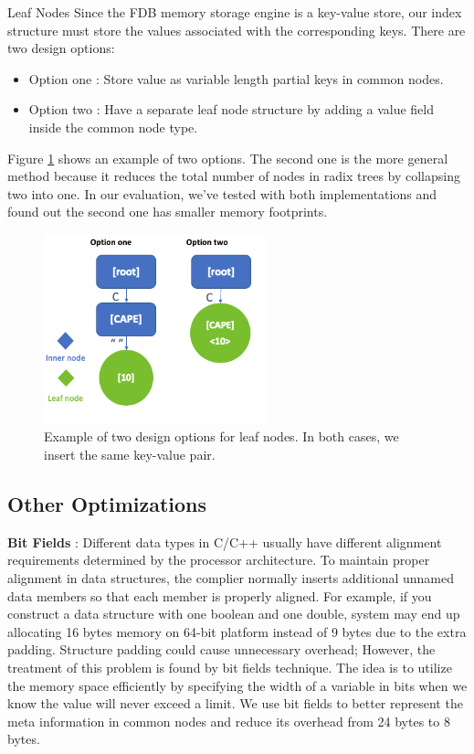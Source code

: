 \documentclass[sigplan,screen,nonacm]{acmart}
\makeatletter
\def\subsubsection{\@startsection{subsubsection}{3}%
  \z@{.5\linespacing\@plus.7\linespacing}{.1\linespacing}%
  {\normalfont\itshape}}
\makeatother
\begin{document}
\subsubsection{Leaf Nodes}
Since the FDB memory storage engine is a key-value store, our index structure must store the values associated with the corresponding keys. There are two design options: 
\begin{itemize}
    \item Option one : Store value as variable length partial keys in common nodes. 
    \item Option two : Have a separate leaf node structure by adding a value field inside the common node type. 
\end{itemize}
Figure \ref{fig:leaf-nodes} shows an example of two options. The second one is the more general method because it reduces the total number of nodes in radix trees by collapsing two into one. In our evaluation, we’ve tested with both implementations and found out the second one has smaller memory footprints. 
\begin{figure}[h]
  \centering
  \includegraphics[width=\linewidth, height=5.5cm]{pic/leaf nodes.png}
  \setlength{\belowcaptionskip}{-10pt} 
  \caption{Example of two design options for leaf nodes. In both cases, we insert the same key-value pair.}
  \label{fig:leaf-nodes}
\end{figure}

\subsection{Other Optimizations}
\textbf {Bit Fields} : Different data types in C/C++ usually have different alignment requirements determined by the processor architecture. To maintain proper alignment in data structures, the complier normally inserts additional unnamed data members so that each member is properly aligned. For example, if you construct a data structure with one boolean and one double, system may end up allocating 16 bytes memory on 64-bit platform instead of 9 bytes due to the extra padding. Structure padding could cause unnecessary overhead; However, the treatment of this problem is found by bit fields technique. The idea is to utilize the memory space efficiently by specifying the width of a variable in bits when we know the value will never exceed a limit. We use bit fields to better represent the meta information in common nodes and reduce its overhead from 24 bytes to 8 bytes.
\end{document}
